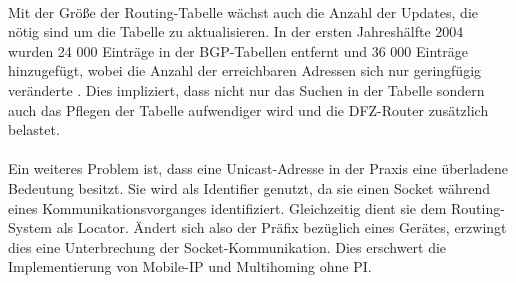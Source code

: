 \paragraph{}
Mit der Größe der Routing-Tabelle wächst auch die Anzahl der Updates, die nötig sind um die Tabelle zu aktualisieren. In der ersten Jahreshälfte 2004 wurden 24 000 Einträge in der BGP-Tabellen entfernt und 36 000 Einträge hinzugefügt, wobei die Anzahl der erreichbaren Adressen sich nur geringfügig veränderte \cite{journals/ccr/MengXZHLZ04}. Dies impliziert, dass nicht nur das Suchen in der Tabelle sondern auch das Pflegen der Tabelle aufwendiger wird und die DFZ-Router zusätzlich belastet.

\paragraph{} 
Ein weiteres Problem ist, dass eine Unicast-Adresse in der Praxis eine überladene Bedeutung besitzt. Sie wird als Identifier genutzt, da sie einen Socket während eines Kommunikationsvorganges identifiziert. Gleichzeitig dient sie dem Routing-System als Locator. Ändert sich also der Präfix bezüglich eines Gerätes, erzwingt dies eine Unterbrechung der Socket-Kommunikation. Dies erschwert die Implementierung von Mobile-IP und Multihoming ohne PI.


